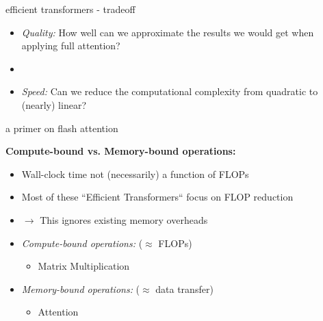 
\begin{frame}{efficient transformers - tradeoff}

\vfill

\begin{itemize}
	\item \textit{Quality:} How well can we approximate the results we would get when applying full attention?
	\item[]
	\item \textit{Speed:} Can we reduce the computational complexity from quadratic to (nearly) linear?
\end{itemize}
	
\vfill

\end{frame}


\begin{frame}{a primer on flash attention}

\vfill

\textbf{Compute-bound vs. Memory-bound operations:}

\begin{itemize}
	\item Wall-clock time not (necessarily) a function of FLOPs
	\item Most of these ``Efficient Transformers`` focus on FLOP reduction
	\item[] $\to$ This ignores existing memory overheads
	\item \textit{Compute-bound operations:} ($\approx$ FLOPs)
			\begin{itemize}
				\item Matrix Multiplication
			\end{itemize}
	\item \textit{Memory-bound operations:} ($\approx$ data transfer)
			\begin{itemize}
				\item Attention
			\end{itemize}
\end{itemize}

\vfill

\end{frame}


